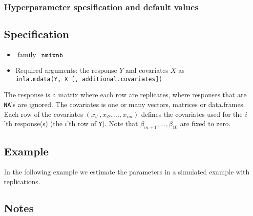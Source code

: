 \documentclass[a4paper,11pt]{article}
\def\mmax{10}
\begin{document}
\subsubsection*{Hyperparameter spesification and default values}


\subsection*{Specification}

\begin{itemize}
\item $\text{family}=\texttt{nmixnb}$
\item Required arguments: the response $Y$ and covariates $X$ as\\
    \verb|inla.mdata(Y, X [, additional.covariates])|
\end{itemize}
The response is a matrix where each row are replicates, where
responses that are \texttt{NA}'s are ignored. The covariates is one or
many vectors, matrices or data.frames. Each row of the covariates
$(x_{i1}, x_{i2}, \ldots, x_{im})$ defines the covariates used for the
$i$'th response(s) (the $i$'th row of \texttt{Y}). Note that 
$\beta_{m+1}, \ldots, \beta_{\mmax}$ are fixed to zero.


\subsection*{Example}

In the following example we estimate the parameters in a simulated
example with replications.



\subsection*{Notes}
\end{document}
